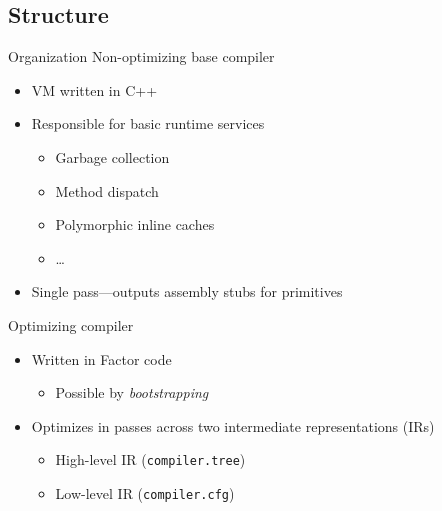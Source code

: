 \documentclass{beamer}
\begin{document}
\subsection{Structure}

\begin{frame}{Organization}
  Non-optimizing base compiler
  \begin{itemize}
    \item VM written in C++
    \item Responsible for basic runtime services
    \begin{itemize}
      \item Garbage collection
      \item Method dispatch
      \item Polymorphic inline caches
      \item \ldots
    \end{itemize}
    \item Single pass---outputs assembly stubs for primitives
  \end{itemize}

  \alert{Optimizing compiler}
  \begin{itemize}
    \item Written in Factor code
    \begin{itemize}
      \item Possible by \emph{bootstrapping}
    \end{itemize}
    \item Optimizes in passes across two \alert{intermediate representations}
    (IRs)
    \begin{itemize}
      \item High-level IR (\texttt{compiler.tree})
      \item Low-level IR (\texttt{compiler.cfg})
    \end{itemize}
  \end{itemize}
\end{frame}
\end{document}
